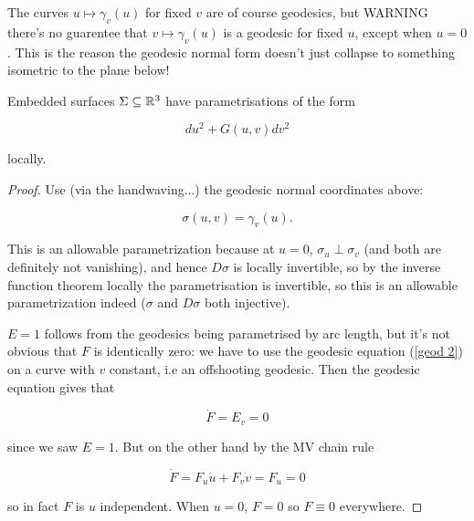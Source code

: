 \documentclass[11pt]{scrartcl}
\begin{document}
\begin{remark}
The curves $u \mapsto \gamma_v(u)$ for fixed $v$ are of course geodesics, but WARNING there's no guarentee that $v \mapsto \gamma_v(u)$ is a geodesic for fixed $u$, except when $u=0$. This is the reason the geodesic normal form doesn't just collapse to something isometric to the plane below!
\end{remark}


\begin{proposition}
Embedded surfaces $\Sigma \subseteq \mathbb R^3$ have parametrisations of the form

\begin{equation}
    du^2 + G(u,v)dv^2
\end{equation}

locally.

\begin{proof}
Use (via the handwaving...) the geodesic normal coordinates above: 

\begin{equation}
    \sigma(u,v) = \gamma_v(u).
\end{equation}


This is an allowable parametrization because at $u=0$, $\sigma_u \perp \sigma_v$ (and both are definitely not vanishing), and hence $D \sigma$ is locally invertible, so by the inverse function theorem locally the parametrisation is invertible, so this is an allowable parametrization indeed ($\sigma$ and $D \sigma$ both injective).


$E=1$ follows from the geodesics being parametrised by arc length, but it's not obvious that $F$ is identically zero: we have to use the geodesic equation (\ref{geod 2}) on a curve with $v$ constant, i.e an offshooting geodesic. Then the geodesic equation gives that 

\begin{equation}
    \dot{F} = E_v = 0
\end{equation}

since we saw $E=1$. But on the other hand by the MV chain rule

\begin{equation}
    \dot{F} = F_u \dot{u} + F_v\dot{v} = F_u = 0
\end{equation}

so in fact $F$ is $u$ independent. When $u=0$, $F=0$ so $F \equiv 0$ everywhere.
\end{proof}
\end{proposition}
\end{document}
